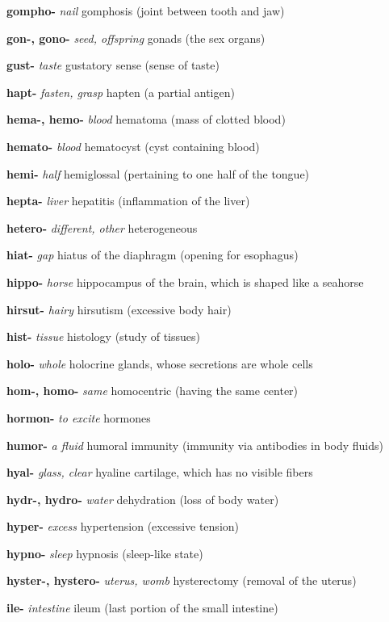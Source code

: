 \documentclass[10pt]{article}
\begin{document}
\begin{multicols}{2}
\begin{hangparas}{10pt}{1}
 \textbf{gompho-} \textit{nail} gomphosis (joint between tooth and jaw) \par
 \textbf{gon-, gono-} \textit{seed, offspring} gonads (the sex organs) \par
 \textbf{gust-} \textit{taste} gustatory sense (sense of taste) \par
 \textbf{hapt-} \textit{fasten, grasp} hapten (a partial antigen) \par
 \textbf{hema-, hemo-} \textit{blood} hematoma (mass of clotted blood) \par
 \textbf{hemato-} \textit{blood} hematocyst (cyst containing blood) \par
 \textbf{hemi-} \textit{half} hemiglossal (pertaining to one half of the tongue) \par
 \textbf{hepta-} \textit{liver} hepatitis (inflammation of the liver) \par
 \textbf{hetero-} \textit{different, other} heterogeneous \par
 \textbf{hiat-} \textit{gap} hiatus of the diaphragm (opening for esophagus) \par
 \textbf{hippo-} \textit{horse} hippocampus of the brain, which is shaped like a seahorse \par
 \textbf{hirsut-} \textit{hairy} hirsutism (excessive body hair) \par
 \textbf{hist-} \textit{tissue} histology (study of tissues) \par
 \textbf{holo-} \textit{whole} holocrine glands, whose secretions are whole cells \par
 \textbf{hom-, homo-} \textit{same} homocentric (having the same center) \par
 \textbf{hormon-} \textit{to excite} hormones \par
 \textbf{humor-} \textit{a fluid} humoral immunity (immunity via antibodies in body fluids) \par
 \textbf{hyal-} \textit{glass, clear} hyaline cartilage, which has no visible fibers \par
 \textbf{hydr-, hydro-} \textit{water} dehydration (loss of body water) \par
 \textbf{hyper-} \textit{excess} hypertension (excessive tension) \par
 \textbf{hypno-} \textit{sleep} hypnosis (sleep-like state) \par
 \textbf{hyster-, hystero-} \textit{uterus, womb} hysterectomy (removal of the uterus) \par
 \textbf{ile-} \textit{intestine} ileum (last portion of the small intestine) \par

\end{hangparas}
\end{multicols}
\end{document}

